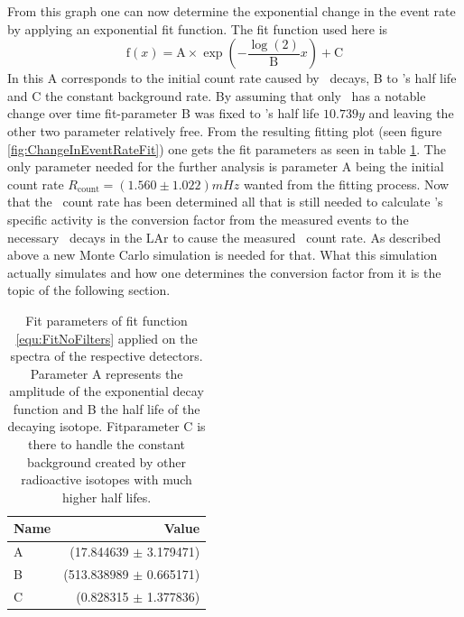 \documentclass[encoding=utf8,british]{tumphthesis}
\begin{document}
From this graph one can now determine the exponential change in the event rate by applying an exponential fit function.
The fit function used here is
\begin{equation}
\mathrm{f}(x) = \mathrm{A}\times\exp\left(-\frac{\log(2)}{\mathrm{B}} x \right) + \mathrm{C}
\label{equ:FitFilters2}
\end{equation}
In this A corresponds to the initial count rate caused by \Kr\ decays, B to \Kr's half life and C the constant background rate.
By assuming that only \Kr\ has a notable change over time fit-parameter B was fixed to \Kr's half life \(10.739\unit{y}\) and leaving the other two parameter relatively free.
From the resulting fitting plot (seen figure \ref{fig:ChangeInEventRateFit}) one gets the fit parameters as seen in table \ref{tab:FitParZeit}.
The only parameter needed for the further analysis is parameter \(\mathrm{A}\) being the initial count rate $R_{\mathrm{count}} = (1.560\pm1.022) \unit{mHz}$ wanted from the fitting process. 
Now that the \Kr\ count rate has been determined all that is still needed to calculate \Kr's specific activity is the conversion factor from the measured events to the necessary \Kr\ decays in the LAr to cause the measured \Kr\ count rate.
As described above a new Monte Carlo simulation is needed for that.
What this simulation actually simulates and how one determines the conversion factor from it is the topic of the following section.


\begin{table}[t!]
	\centering
	\begin{tabular}{|l|r|}
		\hline
		Name	& Value  \\ 
		\hline
		A  &	(17.844639 \(\pm\)	3.179471)\\	
		\hline
		B  &	(513.838989 \(\pm\)	0.665171)\\	
		\hline
		C  &	(0.828315 \(\pm\)	1.377836)\\
		\hline
	\end{tabular}
	\caption{
		Fit parameters of fit function \ref{equ:FitNoFilters} applied on the spectra of the respective detectors.
		Parameter A represents the amplitude of the exponential decay function and B the half life of the decaying isotope.
		Fitparameter C is there to handle the constant background created by other radioactive isotopes with much higher half lifes.
		}
    \label{tab:FitParZeit}
\end{table}
\end{document}
